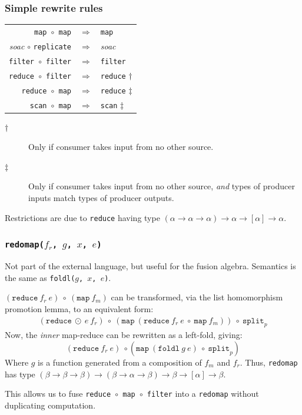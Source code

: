 \documentclass[rgb,dvipsnames]{beamer}
\begin{document}
\begin{frame}[fragile]
  \frametitle{Simple rewrite rules}

  \begin{center}
    \begin{tabular}{rcl}
      \texttt{map $\circ$ map}    & $\Rightarrow$ & \texttt{map} \\
      \textit{soac} $\circ$ \texttt{replicate} & $\Rightarrow$ & \textit{soac} \\
      \texttt{filter $\circ$ filter} & $\Rightarrow$ & \texttt{filter}  \\
      \texttt{reduce $\circ$ filter} & $\Rightarrow$ & \texttt{reduce} $\dag$  \\
      \texttt{reduce $\circ$ map} & $\Rightarrow$ & \texttt{reduce} $\ddag$ \\
      \texttt{scan $\circ$ map} & $\Rightarrow$ & \texttt{scan} $\ddag$ \\
    \end{tabular}
  \end{center}

  \begin{description}
  \item[$\dag$] Only if consumer takes input from no other
    source.
  \item[$\ddag$] Only if consumer takes input from no other source,
    \textit{and} types of producer inputs match types of producer
    outputs.
  \end{description}

  Restrictions are due to \texttt{reduce} having type
  $(\alpha\rightarrow\alpha\rightarrow\alpha)\rightarrow\alpha\rightarrow[\alpha]\rightarrow\alpha$.

\end{frame}

\begin{frame}[fragile,t]
  \frametitle{  \texttt{redomap($f_{r}$, $g$, $x$, $e$)}}

  Not part of the external language, but useful for the fusion
  algebra.  Semantics is the same as \texttt{\tt foldl($g$, $x$, $e$)}.

  $(\texttt{reduce}\ f_{r}\ e)\ \circ\ (\texttt{map}\ f_{m})$ can be
  transformed, via the list homomorphism promotion lemma, to an
  equivalent form:
  \begin{gather*}
    (\texttt{reduce}\ \odot\
    e\ f_{r})\ \circ\ (\texttt{map}\ ({\texttt{reduce}\ f_{r}\ e\ \circ\ \texttt{map}\ f_{m}}))\ \circ\ \texttt{split}_{p}
  \end{gather*}
  Now, the \textit{inner} map-reduce can be rewritten as a left-fold,
  giving:
  \[
  (\texttt{reduce}\ f_{r}\
  e)\ \circ (\texttt{map} \ ({\texttt{foldl}\ g\ e})\ \circ\ \texttt{split}_{p})
  \]
  Where $g$ is a function generated from a composition of $f_{m}$ and
  $f_{r}$.  Thus, \texttt{redomap} has type
  $(\beta\rightarrow\beta\rightarrow\beta)\rightarrow(\beta\rightarrow\alpha\rightarrow\beta)\rightarrow\beta\rightarrow[\alpha]\rightarrow\beta$.

This allows us to fuse
  \texttt{reduce~$\circ$~map~$\circ$~filter} into a \texttt{redomap}
  without duplicating computation.
\end{frame}
\end{document}
